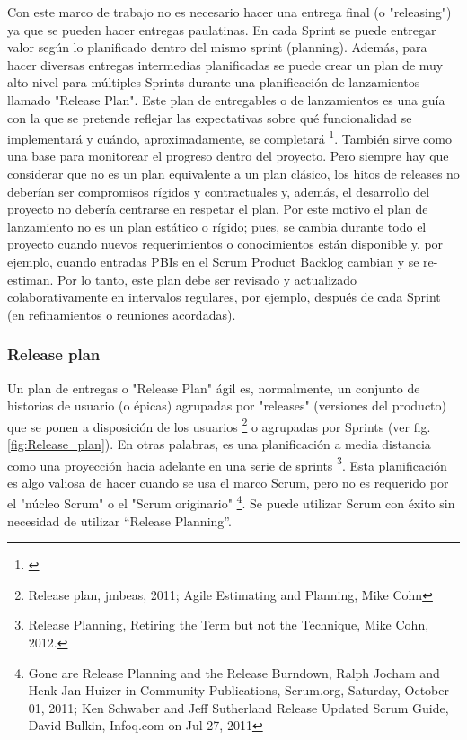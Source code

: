 Con este marco de trabajo no es necesario hacer una entrega final (o "releasing") ya que se pueden hacer entregas paulatinas. En cada Sprint se puede entregar valor según lo planificado dentro del mismo sprint (planning). Además, para hacer diversas entregas intermedias planificadas se puede crear un plan de muy alto nivel para múltiples Sprints durante una planificación de lanzamientos llamado "Release Plan". Este plan de entregables o de lanzamientos es una guía con la que se pretende reflejar las expectativas sobre qué funcionalidad se implementará y cuándo, aproximadamente, se completará \footnote{\cite{Scrum-Institute-2015}}. También sirve como una base para monitorear el progreso dentro del proyecto. Pero siempre hay que considerar que no es un plan equivalente a un plan clásico, los hitos de releases no deberían ser compromisos rígidos y contractuales y, además, el desarrollo del proyecto no debería centrarse en respetar el plan. Por este motivo el plan de lanzamiento no es un plan estático o rígido; pues, se cambia durante todo el proyecto cuando nuevos requerimientos o conocimientos están disponible y, por ejemplo, cuando entradas PBIs en el Scrum Product Backlog cambian y se re-estiman. Por lo tanto, este plan debe ser revisado y actualizado colaborativamente en intervalos regulares, por ejemplo, después de cada Sprint (en refinamientos o reuniones acordadas).

\subsubsection{Release plan}

Un plan de entregas o "Release Plan" ágil es, normalmente, un conjunto de historias de usuario (o épicas) agrupadas por "releases" (versiones del producto) que se ponen a disposición de los usuarios \footnote{Release plan, jmbeas, 2011; Agile Estimating and Planning, Mike Cohn} o agrupadas por Sprints (ver fig. \ref{fig:Release_plan}). En otras palabras, es una planificación a media distancia como una proyección hacia adelante en una serie de sprints \footnote{Release Planning, Retiring the Term but not the Technique, Mike Cohn, 2012.}. Esta planificación es algo valiosa de hacer cuando se usa el marco Scrum, pero no es requerido por el "núcleo Scrum" o el "Scrum originario" \footnote{Gone are Release Planning and the Release Burndown, Ralph Jocham and Henk Jan Huizer in Community Publications, Scrum.org, Saturday, October 01, 2011; Ken Schwaber and Jeff Sutherland Release Updated Scrum Guide, David Bulkin, Infoq.com on Jul 27, 2011}. Se puede utilizar Scrum con éxito sin necesidad de utilizar “Release Planning”.

